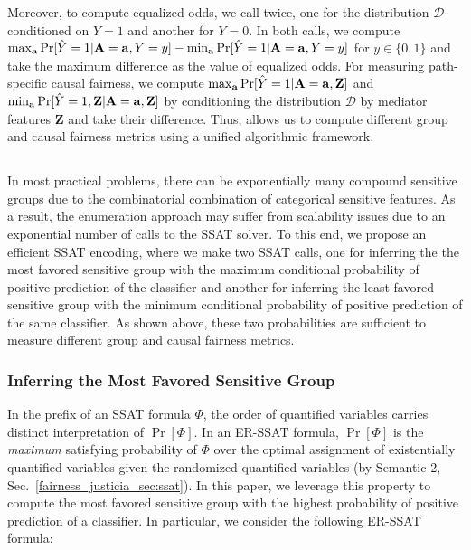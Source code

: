 Moreover, to compute equalized odds, we call {\justicia} twice, one for the distribution $ \mathcal{D} $ conditioned on $ Y = 1  $ and another for $ Y = 0 $. In both calls, we compute $ \max_{ \mathbf{a}} \Pr[\hat{Y} =1 | \mathbf{A} = \mathbf{a}, Y = y ]  - \min_{ \mathbf{a}} \Pr[\hat{Y} =1 | \mathbf{A} = \mathbf{a}, Y = y ] $ for $ y \in \{0,1\} $ and take the  maximum difference as the value of equalized odds. 
For measuring path-specific causal fairness, we compute  $ \max_{ \mathbf{a}} \Pr[\hat{Y} =1 | \mathbf{A} = \mathbf{a}, \mathbf{Z}] $ and  $ \min_{ \mathbf{a}} \Pr[\hat{Y} =1, \mathbf{Z}| \mathbf{A} = \mathbf{a} , \mathbf{Z}] $ by conditioning the distribution $ \mathcal{D} $ by mediator features $ \mathbf{Z} $ and take their difference. Thus, {\justiciaenum} allows us to compute different group and causal fairness metrics using a unified algorithmic framework.





\subsection{}
\label{fairness_justicia_sec:learn_ssat}
In most practical problems, there can be exponentially many compound sensitive groups due to the combinatorial combination of categorical sensitive features.  As a result, the enumeration approach may suffer from scalability issues due to an exponential number of calls to the SSAT solver. To this end, we propose an efficient SSAT encoding, where we make two SSAT calls, one for inferring the the most favored sensitive group with the maximum conditional probability of positive prediction of the classifier and another for inferring the least favored sensitive group with the minimum conditional probability of positive prediction of the same classifier. As shown above, these two probabilities are sufficient to measure different group and causal fairness metrics.

\subsubsection{Inferring the Most Favored Sensitive Group}
In the prefix of an SSAT formula $ \Phi $, the order of quantified variables carries distinct interpretation of  $ \Pr[\Phi] $.   In an ER-SSAT formula, $ \Pr[\Phi] $ is the \textit{maximum} satisfying probability of $ \Phi $ over the optimal assignment of existentially quantified variables given the randomized quantified variables (by Semantic 2, Sec.~\ref{fairness_justicia_sec:ssat}). In this paper, we leverage this property to compute the most favored sensitive group with the highest probability of positive prediction of a classifier. In particular, we consider the following ER-SSAT formula:

